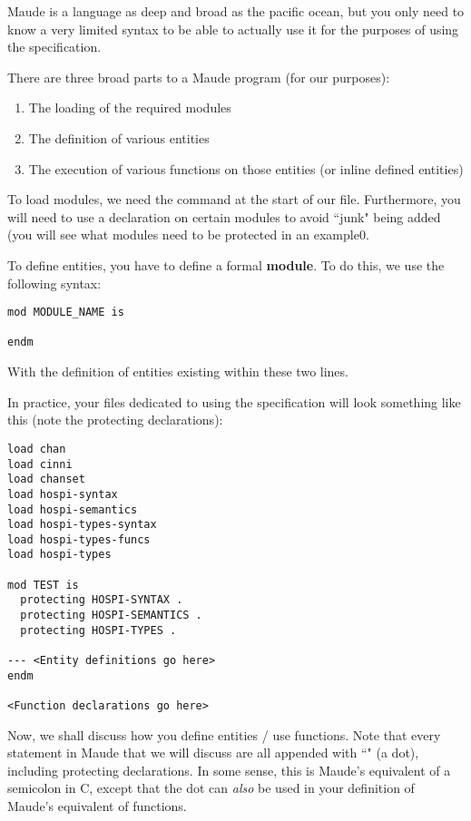 Maude is a language as deep and broad as the pacific ocean, but you only need to know a very limited syntax to be able to actually use it for the purposes of using the specification.

There are three broad parts to a Maude program (for our purposes):
\begin{enumerate}
    \item The loading of the required modules
    \item The definition of various entities 
    \item The execution of various functions on those entities (or inline defined entities)
\end{enumerate}

To load modules, we need the  command at the start of our file. Furthermore, you will need to use a  declaration on certain modules to avoid ``junk" being added (you will see what modules need to be protected in an example0.

To define entities, you have to define a formal \textbf{module}. To do this, we use the following syntax:

\begin{verbatim}
mod MODULE_NAME is

endm
\end{verbatim}
With the definition of entities existing within these two lines.

In practice, your files dedicated to using the specification will look something like this (note the protecting declarations):
\begin{verbatim}
load chan
load cinni
load chanset
load hospi-syntax
load hospi-semantics
load hospi-types-syntax
load hospi-types-funcs
load hospi-types

mod TEST is
  protecting HOSPI-SYNTAX .
  protecting HOSPI-SEMANTICS .
  protecting HOSPI-TYPES .

--- <Entity definitions go here>
endm

<Function declarations go here>

\end{verbatim}

Now, we shall discuss how you define entities / use functions. Note that every statement in Maude that we will discuss are all appended with ``" (a dot), including protecting declarations. In some sense, this is Maude's equivalent of a semicolon in C, except that the dot can \textit{also} be used in your definition of Maude's equivalent of functions.

